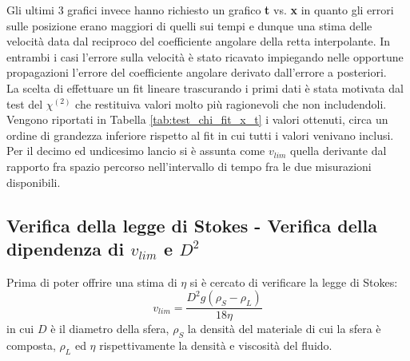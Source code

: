 \documentclass[a4paper,11pt,oneside]{article}
\begin{document}
Gli ultimi 3 grafici invece hanno richiesto un grafico \textbf{t} vs. \textbf{x} in quanto gli errori sulle posizione erano maggiori di quelli sui tempi e dunque una stima delle velocità data dal reciproco del coefficiente angolare della retta interpolante. In entrambi i casi l'errore sulla velocità è stato ricavato impiegando nelle opportune propagazioni l'errore del coefficiente angolare derivato dall'errore a posteriori.\\
La scelta di effettuare un fit lineare trascurando i primi dati è stata motivata dal test del ${\chi}^{(2)}$ che restituiva valori molto più ragionevoli che non includendoli. Vengono riportati in Tabella \ref{tab:test_chi_fit_x_t} i valori ottenuti, circa un ordine di grandezza inferiore rispetto al fit in cui tutti i valori venivano inclusi.\\


Per il decimo ed undicesimo lancio si è assunta come $v_{lim}$ quella derivante dal rapporto fra spazio percorso nell'intervallo di tempo fra le due misurazioni disponibili. 


 



\subsection{Verifica della legge di Stokes - Verifica della dipendenza di $v_{lim}$ e $D^2$}
Prima di poter offrire una stima di $\eta$ si è cercato di verificare la legge di Stokes:
\begin{equation*}
    v_{lim}= \frac{{D}^2g\left(\rho_S - \rho_L\right)}{18 \eta }
\end{equation*}
in cui $D$ è il diametro della sfera, $\rho_S$ la densità del materiale di cui la sfera è composta, $\rho_L$ ed $\eta$ rispettivamente la densità e viscosità del fluido.
\end{document}

